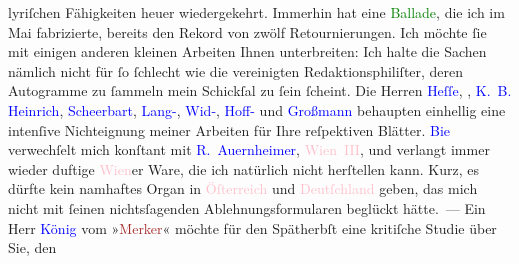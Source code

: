                     lyriſchen Fähigkeiten heuer wiedergekehrt. Immerhin hat eine \textcolor{green}{Ballade}{}, die ich im Mai
                    fabrizierte, bereits den Rekord von zwölf Retournierungen. Ich möchte ſie mit
                    einigen anderen kleinen Arbeiten {\pb}Ihnen unterbreiten: Ich halte die Sachen nämlich nicht für ſo ſchlecht wie die
                    vereinigten Redaktionsphiliſter, deren Autogramme zu ſammeln mein Schickſal zu
                    ſein ſcheint. Die Herren \textcolor{blue}{Heſſe}{}\ledrightnote{\textcolor{blue}{Hermann Hesse}}, \label{K_L01946_3v}\label{K_L01946_3h}, \textcolor{blue}{K. B. Heinrich}{}\ledrightnote{\textcolor{blue}{Karl Borromäus Heinrich}},
                        \textcolor{blue}{Scheerbart}{}\ledrightnote{\textcolor{blue}{Paul Scheerbart}}, \textcolor{blue}{Lang-}{}\ledrightnote{\textcolor{blue}{Philipp Langmann}}, \textcolor{blue}{Wid-}{}\ledrightnote{\textcolor{blue}{Joseph Victor Widmann}}, \textcolor{blue}{Hoff-}{}\ledrightnote{\textcolor{blue}{Camill Hoffmann}} und \textcolor{blue}{Großmann}{}\ledrightnote{\textcolor{blue}{Stefan Großmann}}
                    behaupten einhellig eine intenſive Nichteignung meiner Arbeiten für Ihre
                    reſpektiven Blätter. \textcolor{blue}{Bie}{}\ledrightnote{\textcolor{blue}{Oskar Bie}} verwechſelt mich
                    konſtant mit \textcolor{blue}{R. Auernheimer}{}\ledrightnote{\textcolor{blue}{Raoul Auernheimer}}, \textcolor{pink}{Wien III}{}\ledrightnote{\textcolor{pink}{III., Landstraße}}, und verlangt immer wieder duftige \textcolor{pink}{Wien}{}\ledrightnote{\textcolor{pink}{Wien}}er Ware, die ich natürlich nicht herſtellen kann.
                    Kurz, es dürfte kein namhaftes Organ in \textcolor{pink}{Öſterreich}{}\ledrightnote{\textcolor{pink}{Österreich}} und \textcolor{pink}{Deutſchland}{}\ledrightnote{\textcolor{pink}{Deutschland}} geben, das
                    mich nicht mit ſeinen nichtsſagenden Ablehnungsformularen beglückt hätte. — Ein
                    Herr \textcolor{blue}{König}{}\ledrightnote{\textcolor{blue}{Otto König}} vom »\textcolor{brown}{Merker}{}\ledrightnote{\textcolor{brown}{Der Merker}}« möchte für den Spätherbſt eine kritiſche Studie über Sie, den
